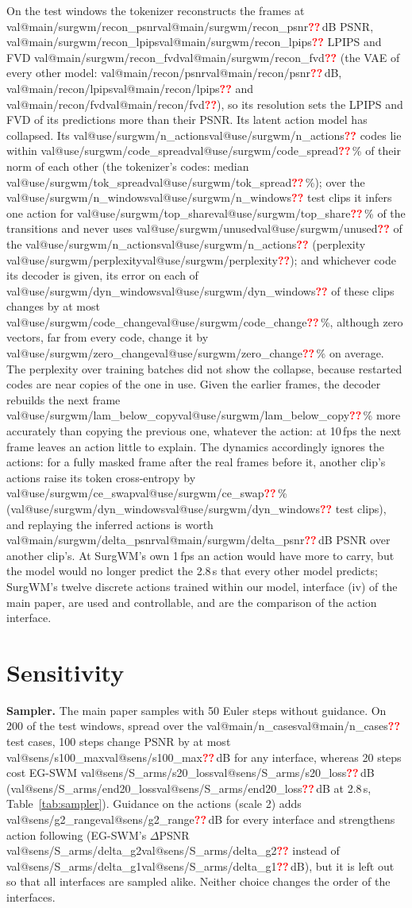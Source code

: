 \documentclass[journal]{IEEEtran}
\makeatletter
\newcommand{\method}{EG-SWM}
\newcommand{\val}[1]{\ifcsname val@#1\endcsname\csname val@#1\endcsname\else\textcolor{red}{\textbf{??}}\fi}
\makeatother
\begin{document}
On the test windows the tokenizer reconstructs the frames at \val{main/surgwm/recon_psnr}\,dB PSNR, \val{main/surgwm/recon_lpips} LPIPS and FVD \val{main/surgwm/recon_fvd} (the VAE of every other model: \val{main/recon/psnr}\,dB, \val{main/recon/lpips} and \val{main/recon/fvd}), so its resolution sets the LPIPS and FVD of its predictions more than their PSNR. Its latent action model has collapsed. Its \val{use/surgwm/n_actions} codes lie within \val{use/surgwm/code_spread}\,\% of their norm of each other (the tokenizer's codes: median \val{use/surgwm/tok_spread}\,\%); over the \val{use/surgwm/n_windows} test clips it infers one action for \val{use/surgwm/top_share}\,\% of the transitions and never uses \val{use/surgwm/unused} of the \val{use/surgwm/n_actions} (perplexity \val{use/surgwm/perplexity}); and whichever code its decoder is given, its error on each of \val{use/surgwm/dyn_windows} of these clips changes by at most \val{use/surgwm/code_change}\,\%, although zero vectors, far from every code, change it by \val{use/surgwm/zero_change}\,\% on average. The perplexity over training batches did not show the collapse, because restarted codes are near copies of the one in use. Given the earlier frames, the decoder rebuilds the next frame \val{use/surgwm/lam_below_copy}\,\% more accurately than copying the previous one, whatever the action: at 10\,fps the next frame leaves an action little to explain. The dynamics accordingly ignores the actions: for a fully masked frame after the real frames before it, another clip's actions raise its token cross-entropy by \val{use/surgwm/ce_swap}\,\% (\val{use/surgwm/dyn_windows} test clips), and replaying the inferred actions is worth \val{main/surgwm/delta_psnr}\,dB PSNR over another clip's. At SurgWM's own 1\,fps an action would have more to carry, but the model would no longer predict the 2.8\,s that every other model predicts; SurgWM's twelve discrete actions trained within our model, interface (iv) of the main paper, are used and controllable, and are the comparison of the action interface.

\section{Sensitivity}\label{sec:sensitivity}
\textbf{Sampler.} The main paper samples with 50 Euler steps without guidance. On 200 of the test windows, spread over the \val{main/n_cases} test cases, 100 steps change PSNR by at most \val{sens/s100_max}\,dB for any interface, whereas 20 steps cost \method{} \val{sens/S_arms/s20_loss}\,dB (\val{sens/S_arms/end20_loss}\,dB at 2.8\,s, Table~\ref{tab:sampler}). Guidance on the actions (scale 2) adds \val{sens/g2_range}\,dB for every interface and strengthens action following (\method{}'s $\Delta$PSNR \val{sens/S_arms/delta_g2} instead of \val{sens/S_arms/delta_g1}\,dB), but it is left out so that all interfaces are sampled alike. Neither choice changes the order of the interfaces.
\end{document}
